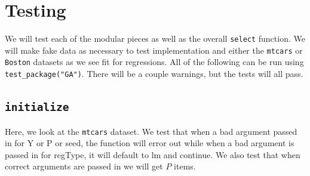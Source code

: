 \documentclass{article}\usepackage[]{graphicx}\usepackage[]{color}
\begin{document}
\section{Testing}
We will test each of the modular pieces as well as the overall \texttt{select} function. We will make fake data as necessary to test implementation and either the \texttt{mtcars} or \texttt{Boston} datasets as we see fit for regressions. All of the following can be run using \texttt{test\_package("GA")}. There will be a couple warnings, but the tests will all pass.



\subsection{\texttt{initialize}}
Here, we look at the \texttt{mtcars} dataset. We test that when a bad argument passed in for Y or P or seed, the function will error out while when a bad argument is passed in for regType, it will default to lm and continue. We also test that when correct arguments are passed in we will get $P$ items.
\end{document}
